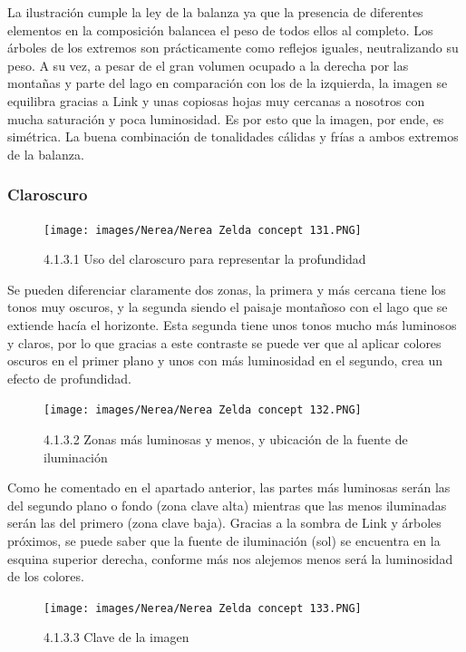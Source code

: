\documentclass[12pt]{article}
\begin{document}
    La ilustración cumple la ley de la balanza ya que la presencia de diferentes elementos en la composición balancea el peso de todos ellos al completo. Los árboles de los extremos son prácticamente como reflejos iguales, neutralizando su peso. A su vez, a pesar de el gran volumen ocupado a la derecha por las montañas y parte del lago en comparación con los de la izquierda, la imagen se equilibra gracias a Link y unas copiosas hojas muy cercanas a nosotros con mucha saturación y poca luminosidad. Es por esto que la imagen, por ende, es simétrica. La buena combinación de tonalidades cálidas y frías a ambos extremos de la balanza.


        \subsubsection{Claroscuro}

        
    \begin{figure}[H]
      \centering
      \texttt{[image: images/Nerea/Nerea Zelda concept 131.PNG]}
      \caption{\small 4.1.3.1 Uso del claroscuro para representar la profundidad}
    \end{figure}

    Se pueden diferenciar claramente dos zonas, la primera y más cercana tiene los tonos muy oscuros, y la segunda siendo el paisaje montañoso con el lago que se extiende hacía el horizonte. Esta segunda tiene unos tonos mucho más luminosos y claros, por lo que gracias a este contraste se puede ver que al aplicar colores oscuros en el primer plano y unos con más luminosidad en el segundo, crea un efecto de profundidad.

    \begin{figure}[H]
      \centering
      \texttt{[image: images/Nerea/Nerea Zelda concept 132.PNG]}
      \caption{\small 4.1.3.2 Zonas más luminosas y menos, y ubicación de la fuente de iluminación}
    \end{figure}

    Como he comentado en el apartado anterior, las partes más luminosas serán las del segundo plano o fondo (zona clave alta) mientras que las menos iluminadas serán las del primero (zona clave baja). Gracias a la sombra de Link y árboles próximos, se puede saber que la fuente de iluminación (sol) se encuentra en la esquina superior derecha, conforme más nos alejemos menos será la luminosidad de los colores.

    \begin{figure}[H]
      \centering
      \texttt{[image: images/Nerea/Nerea Zelda concept 133.PNG]}
      \caption{\small 4.1.3.3 Clave de la imagen}
    \end{figure}
\end{document}
